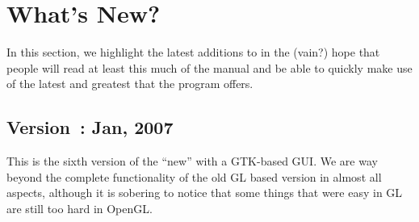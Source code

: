 \section{What's New?}
\label{sec:new-features} 

In this section, we highlight the latest additions to \map{} in the
(vain?) hope that people will read at least this much of the manual
and be able to quickly make use of the latest and greatest that the program
offers.

\subsection{Version~\version{}: Jan, 2007}

This is the sixth version of the ``new'' \map{} with a GTK-based GUI.  We
are way beyond the complete functionality of the old GL
based version in almost all aspects, although it is sobering to notice that
some things that were easy in GL are still too hard in OpenGL. 

